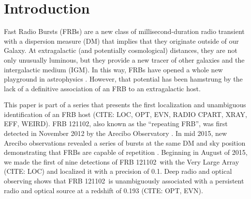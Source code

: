 \documentclass[twocolumn]{aastex61}
\newcommand{\frb}{FRB 121102}
\begin{document}
\begin{abstract}
The millisecond radio transients known as Fast Radio Bursts have recently emerged as a mysterious, new class of astrophysical transient. The discovery of repeating bursts from \frb\ has shown that at least some FRBs are not cataclysmic and opened potential for studying FRB properties via a homogenous sample of bursts. The recent localization of \frb\ with the Very Large Array has helped measure its distance and a host of intrinsic properties. This localization was made with 9 bursts seen by the VLA in coordination the Arecibo, Effelsberg, and AMI-LA observatories. We present a detailed analysis of these bursts, including the first simultaneous detection of an FRB with multiple telescopes. We show that the burst spectra typically have a broad Gaussian shape on the scale of $\sim500$~MHz with fine spectral structure consistent with either scintillation or unresolved temporal structure. We present the luminosity distribution and temporal statistics for \frb\ and argue that the whole FRB population is adequately described by a single class similar to \frb. We close with thoughts on optimal strategies to make new interferometric localizations of FRBs.
\end{abstract}

\section{Introduction}
Fast Radio Bursts (FRBs) are a new class of millisecond-duration radio transient with a dispersion measure (DM) that implies that they originate outside of our Galaxy. At extragalactic (and potentially cosmological) distances, they are not only unusually luminous, but they provide a new tracer of other galaxies and the intergalactic medium (IGM). In this way, FRBs have opened a whole new playground in astrophysics \citep[e.g.,][]{2014A&A...562A.137F, 2014ApJ...780L..33M, 2016MNRAS.457..232C}. However, that potential has been hamstrung by the lack of a definitive association of an FRB to an extragalactic host.

This paper is part of a series that presents the first localization and unambiguous identification of an FRB host (CITE: LOC, OPT, EVN, RADIO CPART, XRAY, EFF, WEIRD). \frb, also known as the ``repeating FRB'', was first detected in November 2012 by the Arecibo Observatory \citep{2014ApJ...790..101S}. In mid 2015, new Arecibo observations revealed a series of bursts at the same DM and sky position demonstrating that FRBs are capable of repetition \citep{2016Natur.531..202S}. Beginning in August of 2015, we made the first of nine detections of \frb\ with the Very Large Array (CITE: LOC) and localized it with a precision of 0.1\arcsec. Deep radio and optical observing shows that \frb\ is unambiguously associated with a persistent radio and optical source at a redshift of 0.193 (CITE: OPT, EVN).
\end{document}
